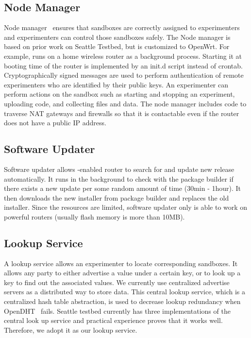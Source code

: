 \subsection{Node Manager}
\label{sec.nodemanager}
Node manager~\cite{nodemanager} ensures that sandboxes are correctly assigned to experimenters and experimenters can control those sandboxes safely. The Node manager is based on prior work on Seattle Testbed, but is customized to OpenWrt. For example, \sysname runs on a home wireless router as a background process. Starting it at booting time of the router is implemented by an init.d script instead of crontab. Cryptographically signed messages are used to perform authentication of remote experimenters who are identified by their public keys. An experimenter can perform actions on the sandbox such as starting and stopping an experiment, uploading code, and collecting files and data. The node manager includes code to traverse NAT gateways and firewalls so that it is contactable even if the router does not have a public IP address. 

\subsection{Software Updater}
\label{sec.softwareupdater}
Software updater allows \sysname-enabled router to search for and update new release automatically. It runs in the background to check with the package builder if there exists a new update per some random amount of time (30min - 1hour). It then downloads the new installer from package builder and replaces the old installer. Since the resources are limited, software updater only is able to work on powerful routers (usually flash memory is more than 10MB).  

\subsection{Lookup Service}
\label{sec.lookupservice}
A lookup service allows an experimenter to locate corresponding sandboxes. It allows any party to either advertise a value under a certain key, or to look up a key to find out the associated values. We currently use centralized advertise servers as a distributed way to store data. This central lookup service, which is a centralized hash table abstraction, is used to decrease lookup redundancy when OpenDHT~\cite{rhea2005opendht} fails. Seattle testbed currently has three implementations of the central look up service and practical experience proves that it works well. Therefore, we adopt it as our lookup service.

